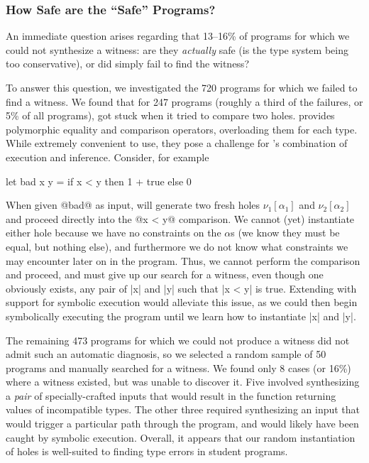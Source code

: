 \subsubsection{How Safe are the ``Safe'' Programs?}
\label{sec:how-safe}

An immediate question arises regarding that 13--16\% of programs for
which we could not synthesize a witness:
%
are they \emph{actually} safe (\ie is the type system being too conservative),
%
or did \toolname simply fail to find the witness?

To answer this question, we investigated the 720 \ucsdbench programs for
which we failed to find a witness.
%
We found that for 247 programs (roughly a third of the failures, or 5\%
of all programs), \toolname got stuck when it tried to compare two holes.
%
\ocaml provides polymorphic equality and comparison operators,
overloading them for each type.
%
While extremely convenient to use, they pose a challenge for \toolname's
combination of execution and inference.
%
Consider, for example
%
\begin{code}
  let bad x y =
    if x < y then
      1 + true
    else
      0
\end{code}
%
When given @bad@ as input, \toolname will generate two fresh holes
$\nu_1[\alpha_1]$ and $\nu_2[\alpha_2]$ and proceed directly into the
@x < y@ comparison.
%
We cannot (yet) instantiate either hole because we have no constraints
on the $\alpha$s (we know they must be equal, but nothing else), and
furthermore we do not know what constraints we may encounter later on in
the program.
%
Thus, we cannot perform the comparison and proceed, and must give up our
search for a witness, even though one obviously exists, any pair of |x|
and |y| such that |x < y| is true.
%
Extending \toolname with support for symbolic execution would alleviate
this issue, as we could then begin symbolically executing the program
until we learn how to instantiate |x| and |y|.

The remaining 473 programs for which we could not produce a witness did
not admit such an automatic diagnosis, so we selected a random sample of
50 programs and manually searched for a witness.
%
We found only 8 cases (or 16\%) where a witness existed, but \toolname
was unable to discover it.
%
Five involved synthesizing a \emph{pair} of specially-crafted inputs
that would result in the function returning values of incompatible
types.
%
The other three required synthesizing an input that would trigger a
particular path through the program, and would likely have been caught
by symbolic execution.
%
Overall, it appears that our random instantiation of holes is well-suited
to finding type errors in student programs.

